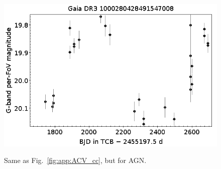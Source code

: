 \documentclass[longauth]{aa}
\begin{document}
\begin{appendix}
\begin{figure}
\hspace{2mm}
 \includegraphics[width=0.45\hsize]{figures/appendix/AGN-56.png} \\
\vspace{4mm}
 \caption{Same as Fig.~\ref{fig:app:ACV_cc}, but for AGN.}
 \label{fig:app:AGN_cc}
\end{figure}




\end{appendix}
\end{document}
